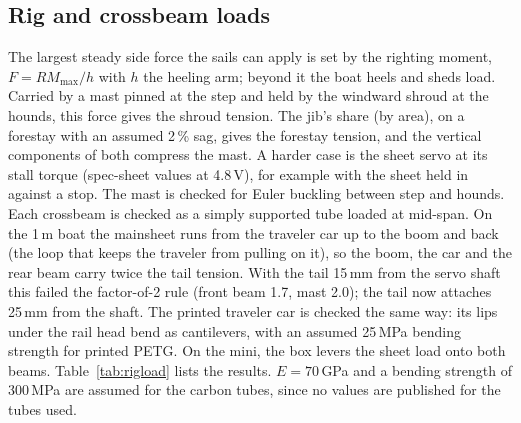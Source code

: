 \documentclass[10pt,twocolumn]{article}
\begin{document}
\subsection{Rig and crossbeam loads}\label{sec:rigload}
The largest steady side force the sails can apply is set by the righting moment, $F = RM_{\max}/h$ with $h$ the heeling arm; beyond it the boat heels and sheds load. Carried by a mast pinned at the step and held by the windward shroud at the hounds, this force gives the shroud tension. The jib's share (by area), on a forestay with an assumed 2\,\% sag, gives the forestay tension, and the vertical components of both compress the mast. A harder case is the sheet servo at its stall torque (spec-sheet values at 4.8\,V), for example with the sheet held in against a stop. The mast is checked for Euler buckling between step and hounds. Each crossbeam is checked as a simply supported tube loaded at mid-span. On the 1\,m boat the mainsheet runs from the traveler car up to the boom and back (the loop that keeps the traveler from pulling on it), so the boom, the car and the rear beam carry twice the tail tension. With the tail 15\,mm from the servo shaft this failed the factor-of-2 rule (front beam 1.7, mast 2.0); the tail now attaches 25\,mm from the shaft. The printed traveler car is checked the same way: its lips under the rail head bend as cantilevers, with an assumed 25\,MPa bending strength for printed PETG. On the mini, the box levers the sheet load onto both beams. Table~\ref{tab:rigload} lists the results. $E = 70$\,GPa and a bending strength of 300\,MPa are assumed for the carbon tubes, since no values are published for the tubes used.

\begin{table}[h]
\centering\small
\caption{Rig and crossbeam loads (sails at the heel limit; ``stall'' adds the sheet servo at stall torque).}
\label{tab:rigload}
\end{table}
\end{document}
